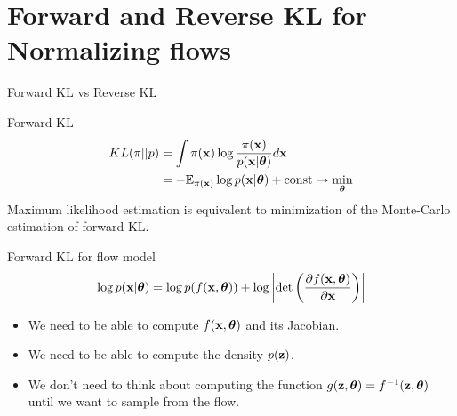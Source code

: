 \section{Forward and Reverse KL for Normalizing flows}
\begin{frame}{Forward KL vs Reverse KL}
	\begin{block}{Forward KL}
		\vspace{-0.5cm}
		\begin{align*}
			KL(\pi || p) &= \int \pi (\mathbf{x}) \log \frac{\pi(\mathbf{x})}{p(\mathbf{x} | \boldsymbol{\theta})} d \mathbf{x} \\
			&= - \mathbb{E}_{\pi(\mathbf{x})} \log p(\mathbf{x} | \boldsymbol{\theta}) + \text{const} \rightarrow \min_{\boldsymbol{\theta}}
		\end{align*}
		Maximum likelihood estimation is equivalent to minimization of the Monte-Carlo estimation of forward KL.
	\end{block}
	\begin{block}{Forward KL for flow model}
	    \vspace{-0.3cm}
		\[
			\log p(\mathbf{x}|\boldsymbol{\theta}) = \log p(f(\mathbf{x}, \boldsymbol{\theta})) + \log  \left|\det \left( \frac{\partial f(\mathbf{x}, \boldsymbol{\theta})}{\partial \mathbf{x}} \right) \right|
		\]
		\begin{itemize}
		\item We need to be able to compute $f(\mathbf{x}, \boldsymbol{\theta})$ and its Jacobian.
		\item We need to be able to compute the density $p(\mathbf{z})$.
		\item We don’t need to think about computing the function $g(\mathbf{z}, \boldsymbol{\theta}) = f^{-1}(\mathbf{z}, \boldsymbol{\theta})$ until we want to sample from the flow.
		\end{itemize}
	\end{block}
\end{frame}
